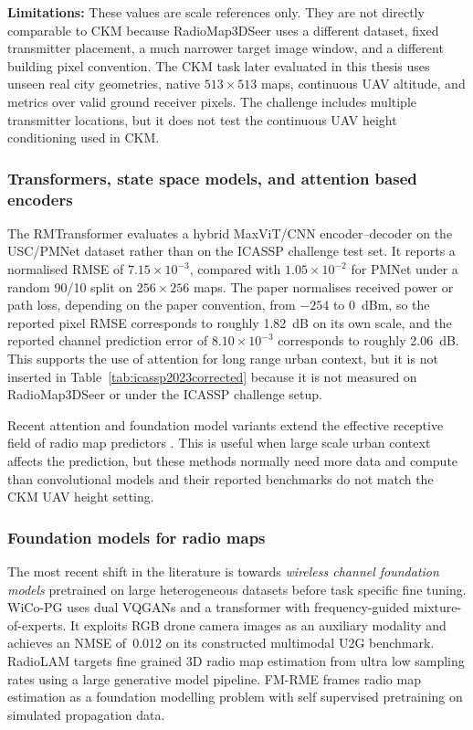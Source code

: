 \textbf{Limitations:} These values are scale references only. They are not
directly comparable to CKM because RadioMap3DSeer uses a different dataset,
fixed transmitter placement, a much narrower target image window, and a
different building pixel convention. The CKM task later evaluated in this
thesis uses unseen real city geometries, native \(513\times513\) maps,
continuous UAV altitude, and metrics over valid ground receiver pixels. The
challenge includes multiple transmitter locations, but it does not test the
continuous UAV height conditioning used in CKM.

\subsubsection{Transformers, state space models, and attention based encoders}

The RMTransformer \cite{rmtransformer2025} evaluates a hybrid MaxViT/CNN
encoder--decoder on the USC/PMNet dataset rather than on the ICASSP challenge
test set.  It reports a normalised RMSE of \(7.15\times10^{-3}\), compared
with \(1.05\times10^{-2}\) for PMNet under a random 90/10 split on
\(256\times256\) maps.  The paper normalises received power or path loss,
depending on the paper convention, from \(-254\) to \SI{0}{dBm}, so the
reported pixel RMSE corresponds to roughly \SI{1.82}{dB} on its own scale, and
the reported channel prediction error of \(8.10\times10^{-3}\) corresponds to
roughly \SI{2.06}{dB}.
This supports the use of attention for long range urban context, but it is not
inserted in Table~\ref{tab:icassp2023corrected} because it is not measured on
RadioMap3DSeer or under the ICASSP challenge setup.

Recent attention and foundation model variants extend the effective receptive
field of radio map predictors \cite{wicopg2025,fmrme2026}. This is useful when
large scale urban context affects the prediction, but these methods normally
need more data and compute than convolutional models and their reported
benchmarks do not match the CKM UAV height setting.

\subsubsection{Foundation models for radio maps}

The most recent shift in the literature is towards \emph{wireless channel
foundation models} pretrained on large heterogeneous datasets before
task specific fine tuning.  WiCo-PG \cite{wicopg2025} uses dual VQGANs and a
transformer with frequency-guided mixture-of-experts.  It exploits RGB drone
camera images as an auxiliary modality and achieves an NMSE of~0.012 on its
constructed multimodal U2G benchmark.  RadioLAM \cite{radiolam2025} targets
fine grained 3D radio map estimation from ultra low sampling rates using a
large generative model pipeline.  FM-RME \cite{fmrme2026} frames radio map estimation as a foundation
modelling problem with self supervised pretraining on simulated propagation
data.


